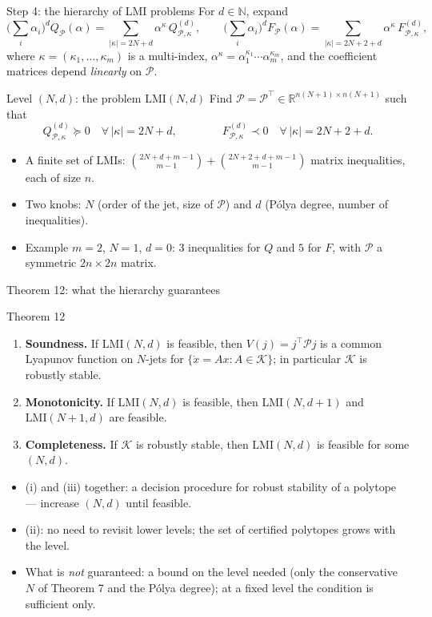 \documentclass[10pt,aspectratio=169]{beamer}
\newcommand{\R}{\mathbb{R}}
\newcommand{\N}{\mathbb{N}}
\newcommand{\tr}{^{\top}}
\newcommand{\PP}{\mathcal{P}}
\newcommand{\KK}{\mathcal{K}}
\begin{document}
\begin{frame}{Step 4: the hierarchy of LMI problems}
For $d\in\N$, expand
\[
\Big(\sum_i\alpha_i\Big)^dQ_\PP(\alpha)=\sum_{|\kappa|=2N+d}\alpha^\kappa\,Q^{(d)}_{\PP,\kappa},\qquad
\Big(\sum_i\alpha_i\Big)^dF_\PP(\alpha)=\sum_{|\kappa|=2N+2+d}\alpha^\kappa\,F^{(d)}_{\PP,\kappa},
\]
where $\kappa=(\kappa_1,\dots,\kappa_m)$ is a multi-index, $\alpha^\kappa=\alpha_1^{\kappa_1}\cdots\alpha_m^{\kappa_m}$, and the coefficient matrices depend \emph{linearly} on $\PP$.
\begin{block}{Level $(N,d)$: the problem $\mathrm{LMI}(N,d)$}
Find $\PP=\PP\tr\in\R^{n(N+1)\times n(N+1)}$ such that
\[
Q^{(d)}_{\PP,\kappa}\succeq0\quad\forall\,|\kappa|=2N+d,\qquad\qquad F^{(d)}_{\PP,\kappa}\prec0\quad\forall\,|\kappa|=2N+2+d .
\]
\end{block}
\begin{itemize}
\item A \alert{finite} set of LMIs: $\binom{2N+d+m-1}{m-1}+\binom{2N+2+d+m-1}{m-1}$ matrix inequalities, each of size $n$.
\item Two knobs: $N$ (order of the jet, size of $\PP$) and $d$ (P\'olya degree, number of inequalities).
\item Example $m=2$, $N=1$, $d=0$: $3$ inequalities for $Q$ and $5$ for $F$, with $\PP$ a symmetric $2n\times2n$ matrix.
\end{itemize}
\end{frame}

\begin{frame}{Theorem 12: what the hierarchy guarantees}
\begin{block}{Theorem 12}
\begin{enumerate}
\item[(i)] \textbf{Soundness.} If $\mathrm{LMI}(N,d)$ is feasible, then $V(j)=j\tr\PP j$ is a common Lyapunov function on $N$-jets for $\{\dot x=Ax:A\in\KK\}$; in particular $\KK$ is robustly stable.
\item[(ii)] \textbf{Monotonicity.} If $\mathrm{LMI}(N,d)$ is feasible, then $\mathrm{LMI}(N,d+1)$ and $\mathrm{LMI}(N+1,d)$ are feasible.
\item[(iii)] \textbf{Completeness.} If $\KK$ is robustly stable, then $\mathrm{LMI}(N,d)$ is feasible for some $(N,d)$.
\end{enumerate}
\end{block}
\begin{itemize}
\item (i) and (iii) together: a \alert{decision procedure} for robust stability of a polytope --- increase $(N,d)$ until feasible.
\item (ii): no need to revisit lower levels; the set of certified polytopes grows with the level.
\item What is \emph{not} guaranteed: a bound on the level needed (only the conservative $N$ of Theorem 7 and the P\'olya degree); at a fixed level the condition is sufficient only.
\end{itemize}
\end{frame}
\end{document}
